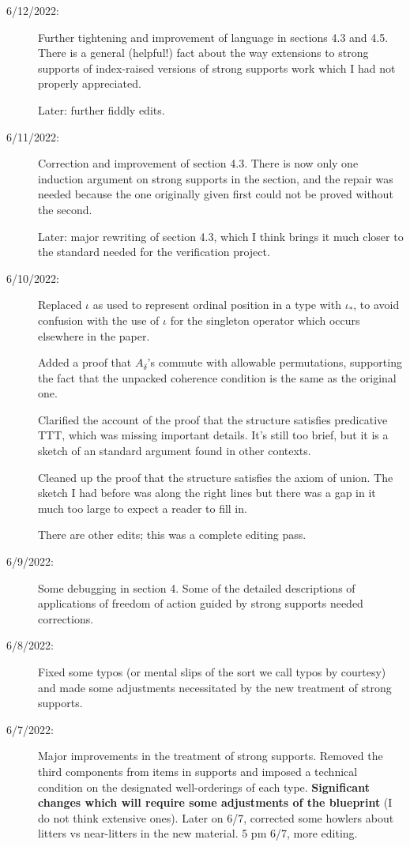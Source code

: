 \documentclass[112pt]{article}
\begin{document}
\begin{description}
\item[6/12/2022:]  Further tightening and improvement of language in sections 4.3 and 4.5.  There is a general (helpful!) fact about the way extensions to strong supports of index-raised versions of strong supports work which I had not properly appreciated.

Later: further fiddly edits.

\item[6/11/2022:]  Correction and improvement of section 4.3.  There is now only one induction argument on strong supports in the section, and the repair was needed because the one originally given first could not be proved without the second.

Later:  major rewriting of section 4.3, which I think brings it much closer to the standard needed for the verification project.

\item[6/10/2022:]  Replaced $\iota$ as used to represent ordinal position in a type with $\iota_*$, to avoid confusion with the use of $\iota$ for the singleton operator which occurs elsewhere in the paper.

Added a proof that $A_\delta$'s commute with allowable permutations, supporting the fact that the unpacked coherence condition is the same as the original one.

Clarified the account of the proof that the structure satisfies predicative TTT, which was missing important details.   It's still too brief, but it is a sketch of an standard argument found in other contexts.

Cleaned up the proof that the structure satisfies the axiom of union.  The sketch I had before was along the right lines but there was a gap in it much too large to expect a reader to fill in.

There are other edits;  this was a complete editing pass.

\item[6/9/2022:]  Some debugging in section 4.  Some of the detailed descriptions of applications of freedom of action guided by strong supports needed corrections.  

\item[6/8/2022:]  Fixed some typos (or mental slips of the sort we call typos by courtesy) and made some adjustments necessitated by the new treatment of strong supports.

\item[6/7/2022:]  Major improvements in the treatment of strong supports.  Removed the third components from items in supports and imposed a technical condition on the designated well-orderings of each type.  {\bf Significant changes which will require some adjustments of the blueprint} (I do not think extensive ones).  Later on 6/7, corrected some howlers about litters vs near-litters in the new material.  5 pm 6/7, more editing.


\end{description}
\end{document}
